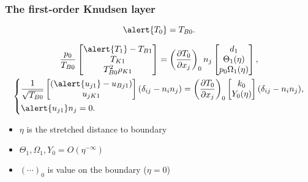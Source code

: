 \documentclass[mathserif]{beamer} %
\newcommand{\pder}[2][]{\frac{\partial#1}{\partial#2}}
\newcommand{\OO}[1]{O(#1)}
\newcommand{\deltann}[2]{(\delta_{#1#2}-n_#1 n_#2)}
\newcommand{\onwall}[1]{\left(#1\right)_0}
\begin{document}
\begin{frame}
    \frametitle{The first-order Knudsen layer}
    \begin{equation}
        \alert{T_0} = T_{B0}. \label{eq:bc_T0}
    \end{equation}

    \begin{gather}
        \frac{p_0}{T_{B0}}
            \begin{bmatrix} \alert{T_1} - T_{B1} \\ T_{K1} \\ T_{B0}^2\rho_{K1} \end{bmatrix} =
            \onwall{\pder[T_0]{x_j}} n_j \begin{bmatrix} d_1 \\ \Theta_1(\eta) \\ p_0\Omega_1(\eta) \end{bmatrix}, \\
        \left\{
        \begin{aligned}
            & \frac1{\sqrt{T_{B0}}}\begin{bmatrix} (\alert{u_{j1}} - u_{Bj1}) \\ u_{jK1} \end{bmatrix} \deltann{i}{j} =
                \onwall{\pder[T_0]{x_j}}\begin{bmatrix} k_0 \\ Y_0(\eta) \end{bmatrix}\deltann{i}{j}, \\
            & \alert{u_{j1}} n_j = 0.
        \end{aligned}
        \right.
    \end{gather}
    \vspace{-20pt}
    \begin{itemize}
        \item \(\eta\) is the stretched distance to boundary
        \item \(\Theta_1, \Omega_1, Y_0 = \OO{\eta^{-\infty}}\)
        \item \(\onwall{\cdots}\) is value on the boundary (\(\eta=0\))
    \end{itemize}
\end{frame}
\end{document}
